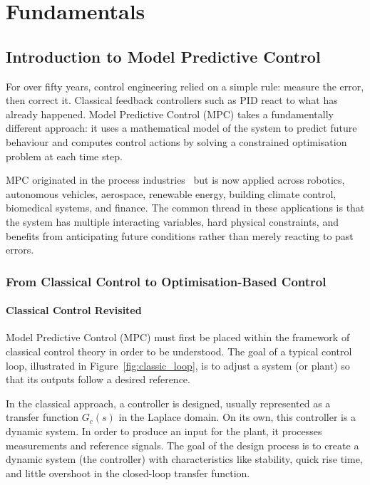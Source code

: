 \part{Fundamentals}
\chapter{Introduction to Model Predictive Control}
\label{chap:introduction}

For over fifty years, control engineering relied on a simple rule: measure the error, then correct it. Classical feedback controllers such as PID react to what has already happened. Model Predictive Control (MPC) takes a fundamentally different approach: it uses a mathematical model of the system to predict future behaviour and computes control actions by solving a constrained optimisation problem at each time step.

MPC originated in the process industries~\cite{Qin2003} but is now applied across robotics, autonomous vehicles, aerospace, renewable energy, building climate control, biomedical systems, and finance. The common thread in these applications is that the system has multiple interacting variables, hard physical constraints, and benefits from anticipating future conditions rather than merely reacting to past errors.

\section{From Classical Control to Optimisation-Based Control}

\subsection{Classical Control Revisited}
Model Predictive Control (MPC) must first be placed within the framework of classical control theory in order to be understood. The goal of a typical control loop, illustrated in Figure~\ref{fig:classic_loop}, is to adjust a system (or plant) so that its outputs follow a desired reference.

In the classical approach, a controller is designed, usually represented as a transfer function $G_c(s)$ in the Laplace domain. On its own, this controller is a dynamic system. In order to produce an input for the plant, it processes measurements and reference signals. The goal of the design process is to create a dynamic system (the controller) with characteristics like stability, quick rise time, and little overshoot in the closed-loop transfer function.

